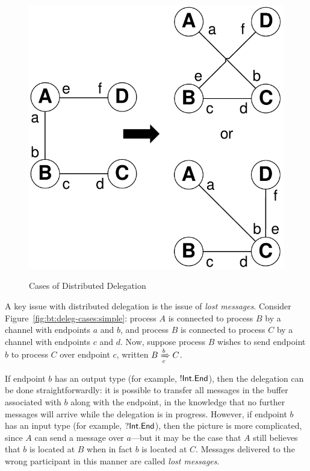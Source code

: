 \documentclass[
graybox,
envcountchap
]{svmult}
\begin{document}
\begin{bibunit}
\begin{figure}
\begin{minipage}{0.475\textwidth}
{       %
        \centering
          \includegraphics[width=0.8\columnwidth]{img/DelegCase2.pdf}
          \label{fig:bt:deleg-cases:entangled}
        }
    \end{minipage}
    \caption{Cases of Distributed Delegation}
    \label{fig:bt:deleg-cases}
  \end{figure}



  A key issue with distributed delegation is the issue of \emph{lost messages}.
  Consider Figure~\ref{fig:bt:deleg-cases:simple}: process $A$ is connected to
  process $B$ by a channel with endpoints $a$ and $b$, and process $B$ is
  connected to process $C$ by a channel with endpoints $c$ and $d$. Now, suppose
  process $B$ wishes to send endpoint $b$ to process $C$ over endpoint $c$,
  written $\triestosend{B}{b}{C}{c}$.

  If endpoint $b$ has an output type (for example, $\gvout{\intty}{\gvend}$), then the
  delegation can be done straightforwardly: it is possible to transfer all
  messages in the buffer associated with $b$ along with the endpoint, in the
  knowledge that no further messages will arrive while the delegation is in
  progress. However, if endpoint $b$ has an input type (for example,
  $\gvin{\intty}{\gvend}$), then the picture is more complicated, since $A$ can
  send a message over $a$---but it may be the case that $A$ still believes that
  $b$ is located at $B$ when in fact $b$ is located at $C$. Messages delivered
  to the wrong participant in this manner are called \emph{lost messages}.


\end{bibunit}
\end{document}
